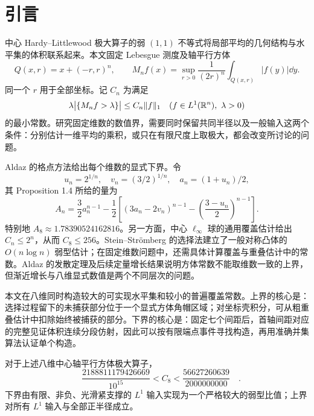 \section{引言}
中心 Hardy--Littlewood 极大算子的弱 $(1,1)$ 不等式将局部平均的几何结构与水平集的体积联系起来。本文固定 Lebesgue 测度及轴平行方体
\[
 Q(x,r)=x+(-r,r)^n,\qquad
 M_nf(x)=\sup_{r>0}\frac{1}{(2r)^n}\int_{Q(x,r)}|f(y)|\dd y.
\]
同一个 $r$ 用于全部坐标。记 $C_n$ 为满足
\begin{equation}\label{eq:weak-definition}
 \lambda\bigl|\{M_nf>\lambda\}\bigr|\le C_n\|f\|_1
 \quad(f\in L^1(\mathbb{R}^n),\ \lambda>0)
\end{equation}
的最小常数。研究固定维数的数值界，需要同时保留共同半径以及一般输入这两个条件：分别估计一维平均的乘积，或只在有限尺度上取极大，都会改变所讨论的问题。

Aldaz 的格点方法给出每个维数的显式下界\cite{Aldaz2000}。令
\[
 u_n=2^{1/n},\quad v_n=(3/2)^{1/n},\quad a_n=(1+u_n)/2,
\]
其 Proposition 1.4 所给的量为
\begin{equation}\label{eq:Aldaz-bound}
 A_n=\frac32a_n^{n-1}
 -\frac12\left[(3a_n-2v_n)^{n-1}
 -\left(\frac{3-u_n}{2}\right)^{n-1}\right].
\end{equation}
特别地 $A_8\approx1.78390524162816$。另一方面，中心 $\ell_\infty$ 球的通用覆盖估计给出 $C_n\le2^n$\cite{AldazKissing2020}，从而 $C_8\le256$。Stein--Str\"omberg 的选择法建立了一般对称凸体的 $O(n\log n)$ 弱型估计\cite{SteinStromberg1983}；在固定维数问题中，还需具体计算覆盖与重叠估计中的常数。Aldaz 的发散定理及后续定量增长结果\cite{Aldaz2011,IakovlevStromberg2013}说明方体常数不能取维数一致的上界，但渐近增长与八维显式数值是两个不同层次的问题。

本文在八维同时构造较大的可实现水平集和较小的普遍覆盖常数。上界的核心是：选择过程留下的未捕获部分位于一个显式方体角帽区域；对坐标壳积分，可从粗重叠估计中扣除始终被捕获的部分。下界的核心是：固定七个间距后，首轴间距对应的完整见证体积连续分段仿射，因此可以按有限端点事件寻找构造，再用准确并集算法认证单个构造。

\begin{theorem}\label{thm:main}
对于上述八维中心轴平行方体极大算子，
\begin{equation}\label{eq:main-bound}
 \boxed{\quad
 \frac{2188811179426669}{10^{15}}<C_8<
 \frac{56627260639}{2000000000}\quad}.
\end{equation}
下界由有限、非负、光滑紧支撑的 $L^1$ 输入实现为一个严格较大的弱型比值；上界对所有 $L^1$ 输入与全部正半径成立。
\end{theorem}


